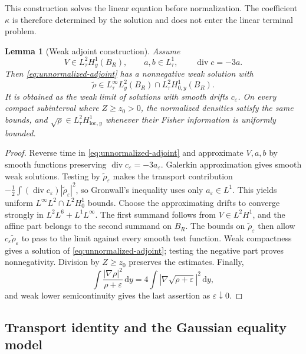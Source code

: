 \documentclass[11pt]{amsart}
\numberwithin{equation}{section}
\theoremstyle{plain}
\newtheorem{lemma}[lemma]{Lemma}
\theoremstyle{definition}
\theoremstyle{remark}
\newcommand{\dd}{\,\mathrm d}
\newcommand{\diver}{\operatorname{div}}
\begin{document}
This construction solves the linear equation before normalization.  The
coefficient \(\kappa\) is therefore determined by the solution and does not
enter the linear terminal problem.

\begin{lemma}[Weak adjoint construction]
\label{lem:weak-adjoint}
Assume
\begin{equation}\label{eq:weak-drift-class}
 V\in L^2_\tau H^1_y(B_R),
 \qquad a,b\in L^1_\tau,
 \qquad \diver c=-3a.
\end{equation}
Then \eqref{eq:unnormalized-adjoint} has a nonnegative weak solution with
\[
 \widetilde\rho\in L^\infty_\tau L^2_y(B_R)
 \cap L^2_\tau H^1_{0,y}(B_R).
\]
It is obtained as the weak limit of solutions with smooth drifts
\(c_\varepsilon\).  On every compact subinterval where \(Z\ge z_0>0\), the
normalized densities satisfy the same bounds, and
\(\sqrt\rho\in L^2_\tau H^1_{\mathrm{loc},y}\) whenever their Fisher
information is uniformly bounded.
\end{lemma}

\begin{proof}
Reverse time in \eqref{eq:unnormalized-adjoint} and approximate \(V,a,b\) by
smooth functions preserving \(\diver c_\varepsilon=-3a_\varepsilon\).
Galerkin approximation gives smooth weak solutions.  Testing by
\(\widetilde\rho_\varepsilon\) makes the transport contribution
\(-\tfrac12\int(\diver c_\varepsilon)
|\widetilde\rho_\varepsilon|^2\), so Gronwall's inequality uses only
\(a_\varepsilon\in L^1\).  This yields uniform
\(L^\infty L^2\cap L^2H^1_0\) bounds.  Choose the approximating drifts to
converge strongly in \(L^2L^6+L^1L^\infty\).  The first summand follows from
\(V\in L^2H^1\), and the affine part belongs to the second summand on
\(B_R\).  The bounds on \(\widetilde\rho_\varepsilon\) then allow
\(c_\varepsilon\widetilde\rho_\varepsilon\) to pass to the limit against
every smooth test function.  Weak compactness gives a solution of
\eqref{eq:unnormalized-adjoint}; testing the negative part proves
nonnegativity.  Division by \(Z\ge z_0\) preserves the estimates.  Finally,
\[
 \int\frac{|\nabla\rho|^2}{\rho+\varepsilon}\dd y
 =4\int\left|\nabla\sqrt{\rho+\varepsilon}\right|^2\dd y,
\]
and weak lower semicontinuity gives the last assertion as
\(\varepsilon\downarrow0\).
\end{proof}

\subsection{Transport identity and the Gaussian equality model}
\end{document}
